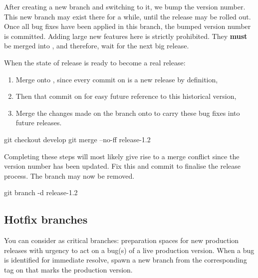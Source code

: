 After creating a new branch and switching to it, we bump the version number. This new branch may exist there for a while, until the release may be rolled out. Once all bug fixes have been applied in this branch, the bumped version number is committed. Adding large new features here is strictly prohibited. They \textbf{must} be merged into , and therefore, wait for the next big release. \newline

When the state of release is ready to become a real release:

\begin{enumerate}
	\item Merge onto , since every commit on  is a new release by definition,
	\item Then  that commit on  for easy future reference to this historical version,
	\item Merge the changes made on the  branch onto  to carry these bug fixes into future releases.
\end{enumerate}

\begin{git-bash}
    git checkout develop
    git merge --no-ff release-1.2
\end{git-bash}

Completing these steps will most likely give rise to a merge conflict since the version number has been updated. Fix this and commit to finalise the release process. The  branch may now be removed.

\begin{git-bash}
    git branch -d release-1.2
\end{git-bash}



\subsection{Hotfix branches}

You can consider  as critical  branches: preparation spaces for new production releases with urgency to act on a bug(s) of a live production version. When a bug is identified for immediate resolve, spawn a new  branch from the corresponding tag on  that marks the production version.

